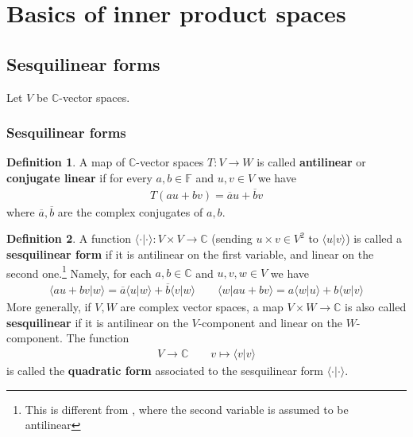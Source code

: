 \documentclass[12pt,b5paper,notitlepage]{article}
\theoremstyle{definition}
\newtheorem{df}{Definition}[subsection]
\theoremstyle{plain}
\newcommand{\ovl}{\overline}
\newcommand{\bk}[1]{\langle {#1}\rangle}
\newcommand{\Cbb}{\mathbb C}
\newcommand{\Fbb}{\mathbb F}
\numberwithin{equation}{section}
\begin{document}
\section{Basics of inner product spaces}




\subsection{Sesquilinear forms}



Let $V$ be $\Cbb$-vector spaces.



\subsubsection{Sesquilinear forms}



\begin{df}
A map of $\Cbb$-vector spaces $T:V\rightarrow W$ is called \textbf{antilinear} or \textbf{conjugate linear}  if for every $a,b\in\Fbb$ and $u,v\in V$ we have
\begin{align*}
T(au+bv)=\ovl au+\ovl bv
\end{align*}
where $\ovl a,\ovl b$ are the complex conjugates of $a,b$.
\end{df}


\begin{df}
A function $\bk{\cdot|\cdot}:V\times V\rightarrow\Cbb$ (sending $u\times v\in V^2$ to $\bk{u|v}$) is called a \textbf{sesquilinear form}  if it is antilinear on the first variable, and linear on the second one.\footnote{This is different from \cite{Gui-A}, where the second variable is assumed to be antilinear} Namely, for each $a,b\in\Cbb$ and $u,v,w\in V$ we have
\begin{gather*}
\bk{au+bv|w}=\ovl a\bk{u|w}+\ovl b\bk{v|w}\qquad \bk{w|au+bv}=a\bk{w|u}+b\bk{w|v}
\end{gather*}
More generally, if $V,W$ are complex vector spaces, a map $V\times W\rightarrow\Cbb$ is also called \textbf{sesquilinear} if it is antilinear on the $V$-component and linear on the $W$-component. The function
\begin{align*}
V\rightarrow\Cbb\qquad v\mapsto\bk{v|v}
\end{align*}
is called the \textbf{quadratic form}  associated to the sesquilinear form $\bk{\cdot|\cdot}$.
\end{df}
\end{document}
